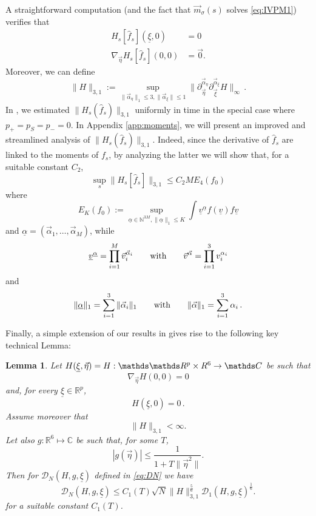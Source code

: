 \documentclass{article}
\newcommand*\R{ \mathds{R} }
\newcommand*\N{ \mathds{N} }
\newcommand\uv{{\underline v}}
\newcommand\uxi{{\underline \xi}}
\newcommand\vv{{\vec v}}
\newcommand\veta{{\vec \eta}}
\newtheorem{mylemma}{Lemma}
\begin{document}
A straightforward computation (and the fact that $\vec m_{\sigma}(s)$ solves \eqref{eq:IVPM1}) verifies that 
%
\begin{align}
H_{s}[\hat{f}_s](\underline \xi, 0) &= 0\\
\nabla_{\vec\eta} H_{s}[\hat{f}_s]( 0,  0) &= \vec 0.
\end{align}
%
Moreover, we can define 
\begin{equation*}
	\|H\|_{3,1}:=\sup_{\|\vec 
\alpha_\eta\|_1\leq3,\|\vec\alpha_\xi\|\leq 
1}\bigl\|\partial_{\vec\eta}^{\vec\alpha_\eta}\partial_{\vec\xi}^{\vec\alpha_\xi}
H\bigr\|_\infty \, .
\end{equation*}
In \cite{BLP25}, we estimated $\|H_s(\hat f_s)\|_{3,1}$ uniformly in time in the special case where $p_+ = p_S = p_- =
0$. In Appendix \ref{app:moments}, we will present an improved and streamlined analysis of $\|H_s(\hat f_s)\|_{3,1}$.
Indeed, since the derivative of $\hat f_s$ are linked to the moments of $f_s$, by analyzing the latter we will show
that, for a suitable constant $C_2$,
\begin{equation*}
\sup_s \|H_s[\hat{ f}_s]\|_{3,1} \leq C_2M E_4(f_0)
\end{equation*}
where
\begin{equation*}
E_K(f_0):=\sup_{\underline\alpha\in\N^{3M}, \|\underline\alpha\|_1\leq K}\int \uv^{\underline\alpha}f(\uv)f\uv
\end{equation*}
and $\underline \alpha=(\vec\alpha_1,\ldots,\vec\alpha_M)$, while
\[
\uv^{\underline\alpha}=\prod_{i=1}^M \vec v_i^{\vec \alpha_i}\qquad\hbox{with}\qquad\vv^{\vec\alpha}=\prod_{i=1}^3 
v_i^{\alpha_i}
\]
and
\[
\|\underline \alpha\|_1=\sum_{i=1}^3\|\vec\alpha_i\|_1\qquad\hbox{with}\qquad\|\vec \alpha\|_1=\sum_{i=1}^3\alpha_i\,.
\]

Finally, a simple extension of our results in \cite{BLP25} gives rise to the following key technical Lemma: 

\begin{mylemma} \label{lem:prop5new} Let $H(\uxi, \veta) = H: \mathds \mathds R^p \times R^6 \to\mathds C$ be 
such that 
\[
\nabla_{\veta}H(0,0)=0
\] 
and, for every $\uxi\in\R^p$, 
\[
H(\uxi, 0)=0\, .
\] 
Assume moreover that 
%
\begin{equation*}
	\|H\|_{3,1} < \infty.	
\end{equation*}
Let also $g:\mathds R^6\mapsto\mathds C$ be such that, for some $T$, 
%
\[
|g(\vec\eta)|\leq \frac1{1+T\|\vec\eta^2\|}.
\]
%
Then for $\mathcal D_N(H,g,\uxi)$ defined in \eqref{eq:DN} we have 
%
\begin{equation*}
\mathcal D_N(H,g,\uxi) \leq C_1(T)\sqrt{N}
\|H\|_{3,1}^{\frac56} \mathcal D_1(H,g,\uxi)^{\frac16} .
\end{equation*}
%
for a suitable constant $C_1(T)$.
\end{mylemma}
 
\end{document}
